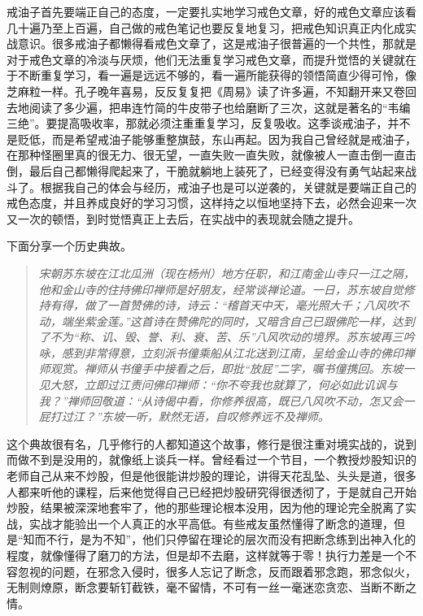 戒油子首先要端正自己的态度，一定要扎实地学习戒色文章，好的戒色文章应该看几十遍乃至上百遍，自己做的戒色笔记也要反复地复习，把戒色知识真正内化成实战意识。很多戒油子都懒得看戒色文章了，这是戒油子很普遍的一个共性，那就是对于戒色文章的冷淡与厌烦，他们无法重复学习戒色文章，而提升觉悟的关键就在于不断重复学习，看一遍是远远不够的，看一遍所能获得的领悟简直少得可怜，像芝麻粒一样。孔子晚年喜易，反反复复把《周易》读了许多遍，不知翻开来又卷回去地阅读了多少遍，把串连竹简的牛皮带子也给磨断了三次，这就是著名的“韦编三绝”。要提高吸收率，那就必须注重重复学习，反复吸收。这季谈戒油子，并不是贬低，而是希望戒油子能够重整旗鼓，东山再起。因为我自己曾经就是戒油子，在那种怪圈里真的很无力、很无望，一直失败一直失败，就像被人一直击倒一直击倒，最后自己都懒得爬起来了，干脆就躺地上装死了，已经变得没有勇气站起来战斗了。根据我自己的体会与经历，戒油子也是可以逆袭的，关键就是要端正自己的戒色态度，并且养成良好的学习习惯，这样持之以恒地坚持下去，必然会迎来一次又一次的顿悟，到时觉悟真正上去后，在实战中的表现就会随之提升。

下面分享一个历史典故。

\begin{quote}\it
    宋朝苏东坡在江北瓜洲（现在杨州）地方任职，和江南金山寺只一江之隔，他和金山寺的住持佛印禅师是好朋友，经常谈禅论道。一日，苏东坡自觉修持有得，做了一首赞佛的诗，诗云：“稽首天中天，毫光照大千；八风吹不动，端坐紫金莲。”这首诗在赞佛陀的同时，又暗含自己已跟佛陀一样，达到了不为“称、讥、毁、誉、利、衰、苦、乐”八风吹动的境界。苏东坡再三吟咏，感到非常得意，立刻派书僮乘船从江北送到江南，呈给金山寺的佛印禅师观赏。禅师从书僮手中接看之后，即批“放屁”二字，嘱书僮携回。东坡一见大怒，立即过江责问佛印禅师：“你不夸我也就算了，何必如此讥讽与我？”禅师回敬道：“从诗偈中看，你修养很高，既已八风吹不动，怎又会一屁打过江？”东坡一听，默然无语，自叹修养远不及禅师。
\end{quote}

这个典故很有名，几乎修行的人都知道这个故事，修行是很注重对境实战的，说到而做不到是没用的，就像纸上谈兵一样。曾经看过一个节目，一个教授炒股知识的老师自己从来不炒股，但是他很能讲炒股的理论，讲得天花乱坠、头头是道，很多人都来听他的课程，后来他觉得自己已经把炒股研究得很透彻了，于是就自己开始炒股，结果被深深地套牢了，他的那些理论根本没用，因为他的理论完全脱离了实战，实战才能验出一个人真正的水平高低。有些戒友虽然懂得了断念的道理，但是“知而不行，是为不知”，他们只停留在理论的层次而没有把断念练到出神入化的程度，就像懂得了磨刀的方法，但是却不去磨，这样就等于零！执行力差是一个不容忽视的问题，在邪念入侵时，很多人忘记了断念，反而跟着邪念跑，邪念似火，无制则燎原，断念要斩钉截铁，毫不留情，不可有一丝一毫迷恋贪恋、当断不断之情。

